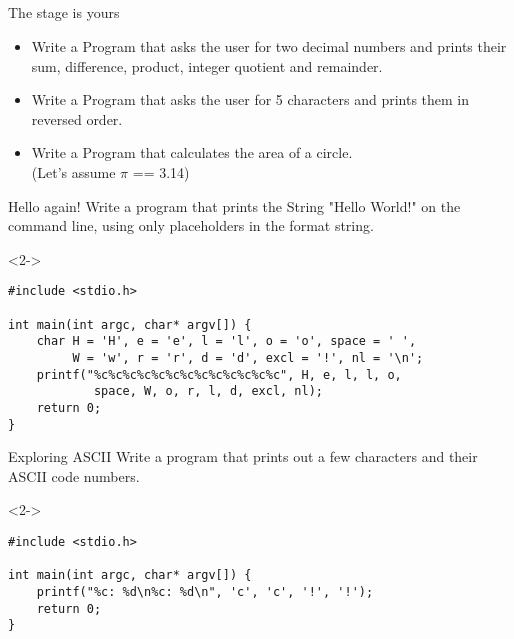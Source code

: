 \subsection{}
\begin{frame}{The stage is yours}
	\begin{itemize}
		\item Write a Program that asks the user for two decimal numbers and prints their sum, difference, product, integer quotient and remainder.
		\item Write a Program that asks the user for 5 characters and prints them in reversed order.
		\item Write a Program that calculates the area of a circle.\\(Let's assume $\pi$ == 3.14)
	\end{itemize}
\end{frame}
\begin{frame}[fragile]{Hello again!}
	Write a program that prints the String "Hello World!" on the command line, using only placeholders in the format string.
	\begin{uncoverenv}<2->
		\begin{lstlisting}
#include <stdio.h>

int main(int argc, char* argv[]) {
	char H = 'H', e = 'e', l = 'l', o = 'o', space = ' ',
		 W = 'w', r = 'r', d = 'd', excl = '!', nl = '\n';
	printf("%c%c%c%c%c%c%c%c%c%c%c%c%c", H, e, l, l, o,
			space, W, o, r, l, d, excl, nl);
	return 0;
}
\end{lstlisting}
	\end{uncoverenv}
\end{frame}
\begin{frame}[fragile]{Exploring ASCII}
	Write a program that prints out a few characters and their ASCII code numbers.
	\begin{uncoverenv}<2->
		\begin{lstlisting}
#include <stdio.h>

int main(int argc, char* argv[]) {
	printf("%c: %d\n%c: %d\n", 'c', 'c', '!', '!');
	return 0;
}
\end{lstlisting}
	\end{uncoverenv}
\end{frame}

